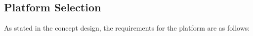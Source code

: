 \documentclass[main.tex]{subfiles}
\begin{document}
\begin{appendices}





\chapter{Platform Selection}
As stated in the concept design, the requirements for the platform are as follows: 


\end{appendices}
\end{document}
